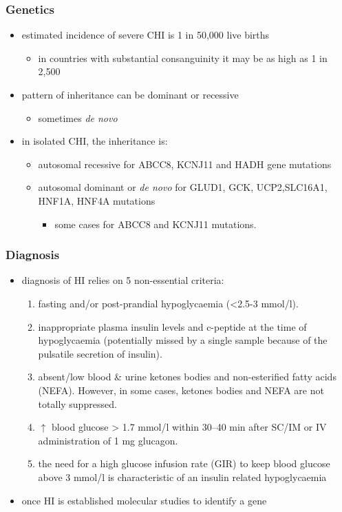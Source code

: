 \documentclass{scrartcl}
\begin{document}
\subsubsection{Genetics}
\label{sec:org02124ff}
\begin{itemize}
\item estimated incidence of severe CHI is 1 in 50,000 live births
\begin{itemize}
\item in countries with substantial consanguinity it may be as high as 1 in 2,500
\end{itemize}
\item pattern of inheritance can be dominant or recessive
\begin{itemize}
\item sometimes \emph{de novo}
\end{itemize}
\item in isolated CHI, the inheritance is:
\begin{itemize}
\item autosomal recessive for ABCC8, KCNJ11 and HADH gene mutations
\item autosomal dominant or \emph{de novo} for GLUD1, GCK, UCP2,SLC16A1, HNF1A, HNF4A mutations
\begin{itemize}
\item some cases for ABCC8 and KCNJ11 mutations.
\end{itemize}
\end{itemize}
\end{itemize}

\subsubsection{Diagnosis}
\label{sec:orgd799691}
\begin{itemize}
\item diagnosis of HI relies on 5 non-essential criteria:
\begin{enumerate}
\item fasting and/or post-prandial hypoglycaemia (<2.5-3 mmol/l).
\item inappropriate plasma insulin levels and c-peptide at the time of
hypoglycaemia (potentially missed by a single sample because of
the pulsatile secretion of insulin).
\item absent/low blood \& urine ketones bodies and non-esterified fatty
acids (NEFA). However, in some cases, ketones bodies and NEFA are
not totally suppressed.
\item \(\uparrow\) blood glucose \textgreater{} 1.7 mmol/l within 30–40 min after
SC/IM or IV administration of 1 mg glucagon.
\item the need for a high glucose infusion rate (GIR) to keep blood
glucose above 3 mmol/l is characteristic of an insulin related
hypoglycaemia
\end{enumerate}

\item once HI is established molecular studies to identify a gene
\end{itemize}
\end{document}
